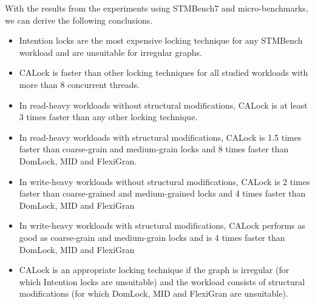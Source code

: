 With the results from the experiments using STMBench7 and micro-benchmarks, we can derive the following conclusions.
\begin{itemize}
	\item Intention locks are the most expensive locking technique for any STMBench workload and are unsuitable for irregular graphs.
	\item CALock is faster than other locking techniques for all studied workloads with more than 8 concurrent threads.

	\item In read-heavy workloads without structural modifications, CALock is at least 3 times faster than any other locking technique.

	\item In read-heavy workloads with structural modifications, CALock is 1.5 times faster than coarse-grain and medium-grain locks and 8 times faster than DomLock, MID and FlexiGran.

	\item In write-heavy workloads without structural modifications, CALock is 2 times faster than coarse-grained and medium-grained locks and 4 times faster than DomLock, MID and FlexiGran

	\item In write-heavy workloads with structural modifications, CALock performs as good as coarse-grain and medium-grain locks and is 4 times faster than DomLock, MID and FlexiGran

	\item CALock is an appropriate locking technique if the graph is irregular (for which Intention locks are unsuitable) and the workload consists of structural modifications (for which DomLock, MID and FlexiGran are unsuitable).
\end{itemize}
